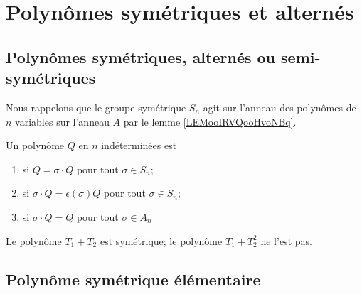\section{Polynômes symétriques et alternés}

\subsection{Polynômes symétriques, alternés ou semi-symétriques}


Nous rappelons que le groupe symétrique \( S_n\) agit sur l'anneau des polynômes de \( n\) variables sur l'anneau \( A\) par le lemme \ref{LEMooIRVQooHvoNBq}.

\begin{definition}
    Un polynôme \( Q\) en \( n\) indéterminées est
    \begin{enumerate}
        \item
             si \( Q=\sigma\cdot Q\) pour tout \( \sigma\in S_n\);
        \item
             si \( \sigma\cdot Q=\epsilon(\sigma)Q\) pour tout \( \sigma\in S_n\);
        \item
             si \( \sigma\cdot Q=Q\) pour tout \( \sigma\in A_n\)
    \end{enumerate}
\end{definition}
Le polynôme \( T_1+T_2\) est symétrique; le polynôme \( T_1+T_2^2\) ne l'est pas.

\subsection{Polynôme symétrique élémentaire}

